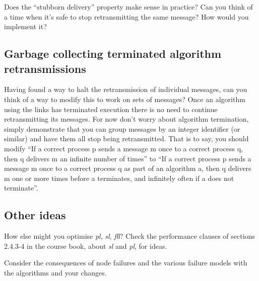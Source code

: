 \documentclass[a4paper]{article}
\begin{document}
Does the ``stubborn delivery'' property make sense in practice? Can you think
of a time when it's safe to stop retransmitting the same message? How would
you implement it?


\subsection{Garbage collecting terminated algorithm retransmissions} %
\label{ssub:halting_retransmission_on_algorithm_termination}

Having found a way to halt the retransmission of individual messages, can you
think of a way to modify this to work on sets of messages? Once an algorithm
using the links has terminated execution there is no need to continue
retransmitting its messages. For now don't worry about algorithm termination,
simply demonstrate that you can group messages by an integer identifier (or
similar) and have them all stop being retransmitted. That is to say, you
should modify ``If a correct process p sends a message m once to a correct
process q, then q delivers m an infinite number of times'' to ``If a correct
process p sends a message m once to a correct process q as part of an
algorithm a, then q delivers m one or more times before a terminates, and
infinitely often if a does not terminate''.


\subsection{Other ideas} %
\label{ssub:other_ideas}

How else might you optimise \emph{pl}, \emph{sl}, \emph{fll}? Check the performance clauses of
sections 2.4.3-4 in the course book, about \emph{sl} and \emph{pl}, for ideas.

Consider the consequences of node failures and the various failure models
with the algorithms and your changes.


\end{document}
